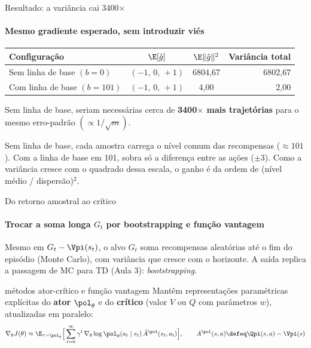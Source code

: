\documentclass[aspectratio=169, 11pt]{beamer}
\newcommand{\ghat}{\hat{g}}
\newcommand{\Ahat}{\hat{A}}
\newcommand{\azul}[1]{{\color{rlAzulClaro}#1}}
\begin{document}
\begin{frame}{Resultado: a variância cai 3400$\times$}
  \framesubtitle{Mesmo gradiente esperado, sem introduzir viés}

  \begin{center}
    \begin{tabular}{@{}lccr@{}}
      \toprule
      \textbf{Configuração} & $\E[\ghat]$ & $\E\|\ghat\|^2$ & \textbf{Variância total} \\
      \midrule
      Sem linha de base $(b=0)$   & $(-1,\,0,\,+1)$ & 6804,67 & {\color{rlLaranja}6802,67} \\
      Com linha de base $(b=101)$ & $(-1,\,0,\,+1)$ & 4,00    & \azul{2,00} \\
      \bottomrule
    \end{tabular}
  \end{center}

  \vspace{0.5em}
  Sem linha de base, seriam necessárias cerca de \textbf{3400$\times$ mais trajetórias}
  para o mesmo erro-padrão $(\propto 1/\sqrt{m})$.

  \begin{ideiabox}[title={Por quê?}]
    Sem linha de base, cada amostra carrega o nível comum das recompensas ($\approx 101$).
    Com a linha de base em 101, sobra só a diferença entre as ações ($\pm 3$). Como a variância
    cresce com o quadrado dessa escala, o ganho é da ordem de (nível médio / dispersão)$^2$.
  \end{ideiabox}
\end{frame}

\begin{frame}{Do retorno amostral ao crítico}
  \framesubtitle{Trocar a soma longa $G_t$ por bootstrapping e função vantagem}

  Mesmo em $G_t - \Vpi(s_t)$, o alvo $G_t$ soma recompensas aleatórias até o fim do episódio
  (Monte Carlo), com variância que cresce com o horizonte. A saída replica a passagem de MC
  para TD (Aula 3): \emph{bootstrapping}.

  \begin{defbox}{métodos ator-crítico e função vantagem}
    Mantêm representações paramétricas explícitas do \textbf{ator} $\pol_\theta$ e do
    \textbf{crítico} (valor $V$ ou $Q$ com parâmetros $w$), atualizadas em paralelo:
    \[
      \nabla_\theta J(\theta) \approx \E_{\tau\sim\pol_\theta}\Big[\sum_{t=0}^{\infty}\gamma^t\,
        \nabla_\theta\log\pol_\theta(a_t\mid s_t)\,\Ahat^{\pol}(s_t,a_t)\Big],
      \qquad
      A^{\pol}(s,a) \defeq \Qpi(s,a) - \Vpi(s)
    \]
  \end{defbox}
\end{frame}
\end{document}
